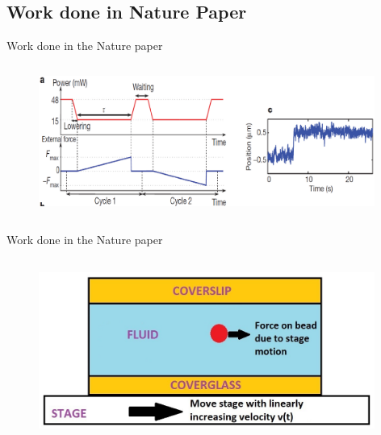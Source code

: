 \documentclass{beamer}
\begin{document}
\subsection{Work done in Nature Paper}
\begin{frame}{Work done in the Nature paper}

\begin{figure}
    \centering
    \includegraphics[height=5cm,width=11cm]{nature_landauer_fig2.eps}
    \label{fig:graph2}
\end{figure}



\end{frame}

\begin{frame}{Work done in the Nature paper}
\begin{figure}
    \centering
    \includegraphics[height=6cm,width=11cm]{fig3.jpg}
    \label{fig:graph3}
\end{figure}

\end{frame}
\end{document}
